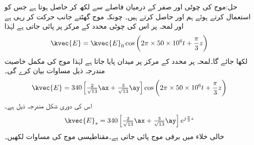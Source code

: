 حل:موج کی چوٹی اور صفر کے درمیان فاصلے سے  لکھ کر  حاصل ہوتا ہے جس کو استعمال کرتے ہوئے ہم    اور  حاصل کرتے  ہیں۔ چونکہ موج گھٹتے  جانب حرکت کر رہی ہے اور لمحہ  پر اس کی چوٹی محدد کے مرکز پر پائی جاتی ہے  لہٰذا 
\begin{align*}
\kvec{E}=\kvec{E}_0 \cos \left(2\pi \times 50 \times 10^6 t + \frac{\pi}{3} z \right)
\end{align*}
لکھا جائے گا۔لمحہ  پر محدد کے مرکز پر میدان  پایا جاتا ہے لہٰذا موج کی مکمل خاصیت مندرجہ ذیل مساوات بیان کرے گی۔ 
\begin{align*}
\kvec{E}=340\left[\tfrac{2}{\sqrt{13}}\ax+\tfrac{3}{\sqrt{13}}\ay\right] \cos \left(2\pi \times 50 \times 10^6 t + \frac{\pi}{3} z \right)
\end{align*}
اس کی دوری شکل مندرجہ ذیل ہے۔
\begin{align*}
\kvec{E}_s=340\left[\tfrac{2}{\sqrt{13}}\ax+\tfrac{3}{\sqrt{13}}\ay\right] e^{j\frac{\pi}{3} z}
\end{align*}
خالی خلاء میں برقی موج  پائی جاتی ہے۔مقناطیسی موج کی مساوات لکھیں۔

